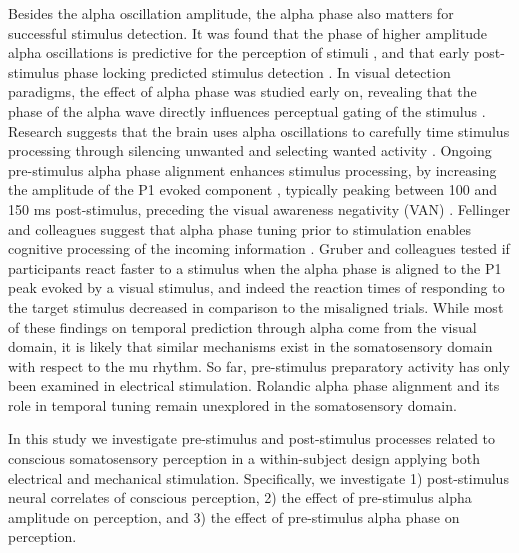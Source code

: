 \documentclass[11pt,a4paper,onecolumn]{article}
\begin{document}
\vspace{5pt}

Besides the alpha oscillation amplitude, the alpha phase also matters for successful stimulus detection. It was found that the phase of higher amplitude alpha oscillations is predictive for the perception of stimuli \cite{aiPhasePrestimulusAlpha2014}, and that early post-stimulus phase locking predicted stimulus detection \cite{palvaEarlyNeuralCorrelates2005}.
In visual detection paradigms, the effect of alpha phase was studied early on, revealing that the phase of the alpha wave directly influences perceptual gating of the stimulus \cite{mathewsonSeeNotSee2009}.
Research suggests that the brain uses alpha oscillations to carefully time stimulus processing through silencing unwanted and selecting wanted activity \cite{klimeschAlphabandOscillationsAttention2012}.
Ongoing pre-stimulus alpha phase alignment enhances stimulus processing, by increasing the amplitude of the P1 evoked component \cite{fellingerPrestimulusAlphaPhasealignment2011}, typically peaking between 100 and 150 ms post-stimulus, preceding the visual awareness negativity (VAN) \cite{koivistoEarliestElectrophysiologicalCorrelate2008, eklundVisualAwarenessNegativity2018}. Fellinger and colleagues suggest that alpha phase tuning prior to stimulation enables cognitive processing of the incoming information \cite{fellingerPrestimulusAlphaPhasealignment2011}.
Gruber and colleagues \cite{gruberAlphaPhaseTemporal2014} tested if participants react faster to a stimulus when the alpha phase is aligned to the P1 peak evoked by a visual stimulus, and indeed the reaction times of responding to the target stimulus decreased in comparison to the misaligned trials.
While most of these findings on temporal prediction through alpha come from the visual domain, it is likely that similar mechanisms exist in the somatosensory domain with respect to the mu rhythm. So far, pre-stimulus preparatory activity has only been examined in electrical stimulation. Rolandic alpha phase alignment and its role in temporal tuning remain unexplored in the somatosensory domain.



In this study we investigate pre-stimulus and post-stimulus processes related to conscious somatosensory perception in a within-subject design applying both electrical and mechanical stimulation. Specifically, we investigate 1) post-stimulus neural correlates of conscious perception, 2) the effect of pre-stimulus alpha amplitude on perception, and 3) the effect of pre-stimulus alpha phase on perception.
\end{document}
